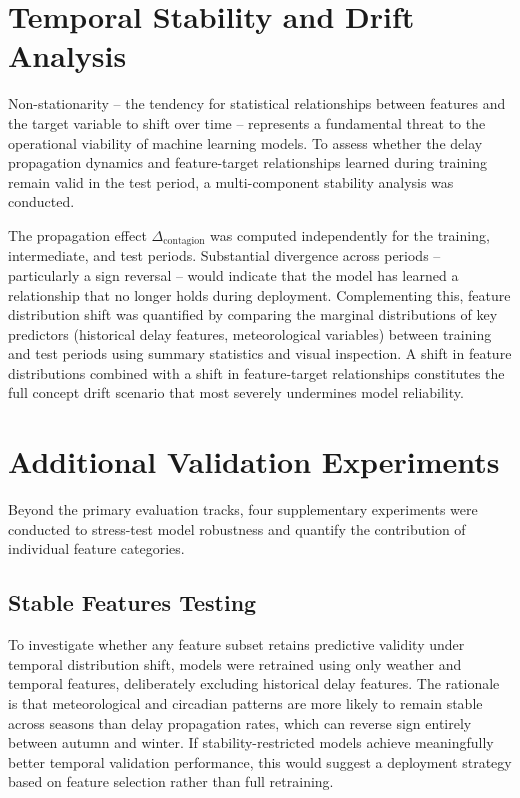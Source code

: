 \documentclass{report}
\begin{document}
\section{Temporal Stability and Drift Analysis}
\label{sec:drift_method}

Non-stationarity -- the tendency for statistical relationships between
features and the target variable to shift over time -- represents a
fundamental threat to the operational viability of machine learning models.
To assess whether the delay propagation dynamics and feature-target
relationships learned during training remain valid in the test period, a
multi-component stability analysis was conducted.

The propagation effect $\Delta_{\text{contagion}}$ was computed independently
for the training, intermediate, and test periods.  Substantial divergence
across periods -- particularly a sign reversal -- would indicate that the
model has learned a relationship that no longer holds during deployment.
Complementing this, feature distribution shift was quantified by comparing
the marginal distributions of key predictors (historical delay features,
meteorological variables) between training and test periods using summary
statistics and visual inspection.  A shift in feature distributions combined
with a shift in feature-target relationships constitutes the full concept
drift scenario that most severely undermines model reliability.


\section{Additional Validation Experiments}
\label{sec:additional_val}

Beyond the primary evaluation tracks, four supplementary experiments were
conducted to stress-test model robustness and quantify the contribution of
individual feature categories.

\subsection{Stable Features Testing}

To investigate whether any feature subset retains predictive validity under
temporal distribution shift, models were retrained using only weather and
temporal features, deliberately excluding historical delay features.  The
rationale is that meteorological and circadian patterns are more likely to
remain stable across seasons than delay propagation rates, which can reverse
sign entirely between autumn and winter.  If stability-restricted models
achieve meaningfully better temporal validation performance, this would
suggest a deployment strategy based on feature selection rather than full
retraining.
\end{document}
